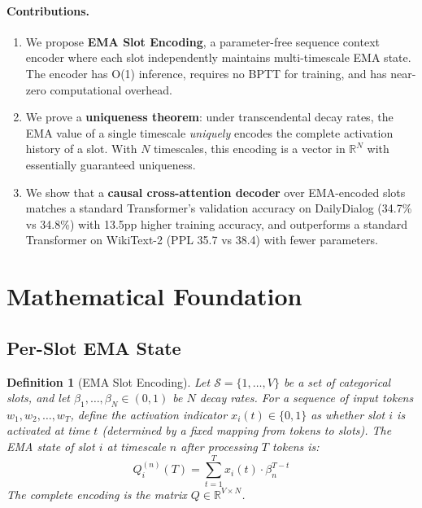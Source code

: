 \documentclass[11pt]{article}
\newtheorem{definition}{Definition}
\begin{document}
\paragraph{Contributions.}
\begin{enumerate}[leftmargin=1.5em]
    \item We propose \textbf{EMA Slot Encoding}, a parameter-free sequence context encoder where each slot independently maintains multi-timescale EMA state. The encoder has O(1) inference, requires no BPTT for training, and has near-zero computational overhead.
    \item We prove a \textbf{uniqueness theorem}: under transcendental decay rates, the EMA value of a single timescale \emph{uniquely} encodes the complete activation history of a slot. With $N$ timescales, this encoding is a vector in $\mathbb{R}^N$ with essentially guaranteed uniqueness.
    \item We show that a \textbf{causal cross-attention decoder} over EMA-encoded slots matches a standard Transformer's validation accuracy on DailyDialog (34.7\% vs 34.8\%) with 13.5pp higher training accuracy, and outperforms a standard Transformer on WikiText-2 (PPL 35.7 vs 38.4) with fewer parameters.
\end{enumerate}

\section{Mathematical Foundation}
\label{sec:math}

\subsection{Per-Slot EMA State}

\begin{definition}[EMA Slot Encoding]
Let $\mathcal{S} = \{1, \dots, V\}$ be a set of categorical slots, and let $\beta_1, \dots, \beta_N \in (0,1)$ be $N$ decay rates. For a sequence of input tokens $w_1, w_2, \dots, w_T$, define the \emph{activation indicator} $x_i(t) \in \{0, 1\}$ as whether slot $i$ is activated at time $t$ (determined by a fixed mapping from tokens to slots). The EMA state of slot $i$ at timescale $n$ after processing $T$ tokens is:
\begin{equation}
Q_i^{(n)}(T) = \sum_{t=1}^{T} x_i(t) \cdot \beta_n^{T - t}
\label{eq:ema}
\end{equation}
The complete encoding is the matrix $Q \in \mathbb{R}^{V \times N}$.
\end{definition}
\end{document}
